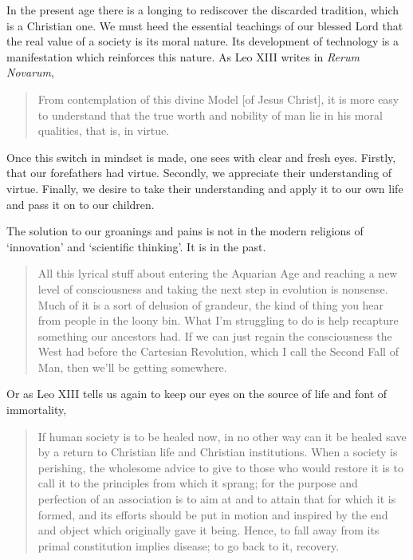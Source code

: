 \documentclass[letterpaper]{article}
\begin{document}
In the present age there is a longing to rediscover the discarded tradition, which is a Christian one. We must heed the essential teachings of our blessed Lord that the real value of a society is its moral nature. Its development of technology is a manifestation which reinforces this nature. As Leo XIII writes in \textit{Rerum Novarum},

\begin{quote}
  From contemplation of this divine Model [of Jesus Christ], it is more easy to understand that the true worth and nobility of man lie in his moral qualities, that is, in virtue.
\end{quote}

Once this switch in mindset is made, one sees with clear and fresh eyes. Firstly, that our forefathers had virtue. Secondly, we appreciate their understanding of virtue. Finally, we desire to take their understanding and apply it to our own life and pass it on to our children.

The solution to our groanings and pains is not in the modern religions of `innovation' and `scientific thinking'. It is in the past.

\begin{quote}
  All this lyrical stuff about entering the Aquarian Age and reaching a new level of consciousness and taking the next step in evolution is nonsense. Much of it is a sort of delusion of grandeur, the kind of thing you hear from people in the loony bin. What I'm struggling to do is help recapture something our ancestors had. If we can just regain the consciousness the West had before the Cartesian Revolution, which I call the Second Fall of Man, then we'll be getting somewhere.

\end{quote}

Or as Leo XIII tells us again to keep our eyes on the source of life and font of immortality,

\begin{quote}
  If human society is to be healed now, in no other way can it be healed save by a return to Christian life and Christian institutions. When a society is perishing, the wholesome advice to give to those who would restore it is to call it to the principles from which it sprang; for the purpose and perfection of an association is to aim at and to attain that for which it is formed, and its efforts should be put in motion and inspired by the end and object which originally gave it being. Hence, to fall away from its primal constitution implies disease; to go back to it, recovery.
\end{quote}
\end{document}
